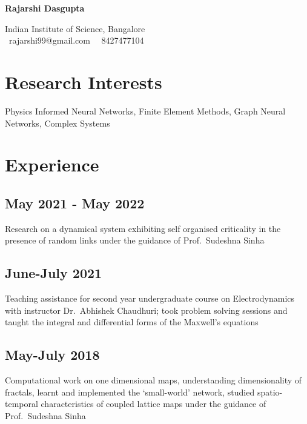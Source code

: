 \documentclass{article}
\newcommand{\theauthor}{Rajarshi Dasgupta}
\begin{document}
\begin{center}
	{\bf \huge \theauthor}

	\vspace{1em}

	Indian Institute of Science, Bangalore\\
	\Letter \, rajarshi99@gmail.com \,
	\faMobilePhone \, 8427477104
\end{center}

\section{Research Interests}

Physics Informed Neural Networks,
Finite Element Methods,
Graph Neural Networks,
Complex Systems

\section{Experience}

\subsection{May 2021 - May 2022}
Research on a dynamical system
exhibiting self organised criticality
in the presence of random links
under the guidance of Prof.~Sudeshna Sinha

\subsection{June-July 2021}
Teaching assistance
for second year undergraduate course
on Electrodynamics
with instructor Dr.~Abhishek Chaudhuri;
took problem solving sessions
and taught the integral and differential forms
of the Maxwell's equations


\subsection{May-July 2018}

Computational work on one dimensional maps,
understanding dimensionality of fractals,
learnt and implemented the `small-world' network,
studied spatio-temporal characteristics
of coupled lattice maps
under the guidance of Prof.~Sudeshna Sinha
\end{document}
